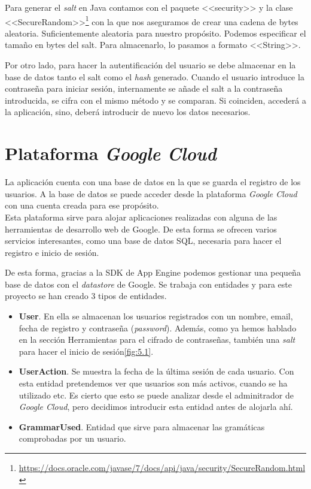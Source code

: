 Para generar el \emph{salt} en Java contamos con el paquete <<security>> y la clase <<SecureRandom>>\footnote{\url{https://docs.oracle.com/javase/7/docs/api/java/security/SecureRandom.html}} con la que nos aseguramos de crear una cadena de bytes aleatoria. Suficientemente aleatoria para nuestro propósito. Podemos especificar el tamaño en bytes del salt. Para almacenarlo, lo pasamos a formato <<String>>. 


Por otro lado, para hacer la autentificación del usuario se debe almacenar en la base de datos tanto el salt como el \emph{hash} generado. Cuando el usuario introduce la contraseña para iniciar sesión, internamente se añade el salt a la contraseña introducida, se cifra con el mismo método y se comparan. Si coinciden, accederá a la aplicación, sino, deberá introducir de nuevo los datos necesarios.



\section{Plataforma \emph{Google Cloud}}


La aplicación cuenta con una base de datos en la que se guarda el registro de los usuarios. A la base de datos se puede acceder desde la plataforma \emph{Google Cloud} con una cuenta creada para ese propósito.\\

Esta plataforma sirve para alojar aplicaciones realizadas con alguna de las  herramientas de desarrollo web de Google. De esta forma se ofrecen varios servicios interesantes, como una base de datos SQL, necesaria para hacer el registro e inicio de sesión.

De esta forma, gracias a la SDK de App Engine podemos gestionar una pequeña base de datos con el \emph{datastore} de Google. Se trabaja con entidades y para este proyecto se han creado 3 tipos de entidades.

\begin{itemize}
\item \textbf{User}. En ella se almacenan los usuarios registrados con un nombre, email, fecha de registro y contraseña (\emph{password}). Además, como ya hemos hablado en la sección Herramientas para el cifrado de contraseñas, también una \emph{salt} para hacer el inicio de sesión\ref{fig:5.1}.
\item \textbf{UserAction}. Se muestra la fecha de la última sesión de cada usuario. Con esta entidad pretendemos ver que usuarios son más activos, cuando se ha utilizado etc. Es cierto que esto se puede analizar desde el adminitrador de \emph{Google Cloud}, pero decidimos introducir esta entidad antes de alojarla ahí.
\item \textbf{GrammarUsed}. Entidad que sirve para almacenar las gramáticas comprobadas por un usuario. 
\end{itemize}

